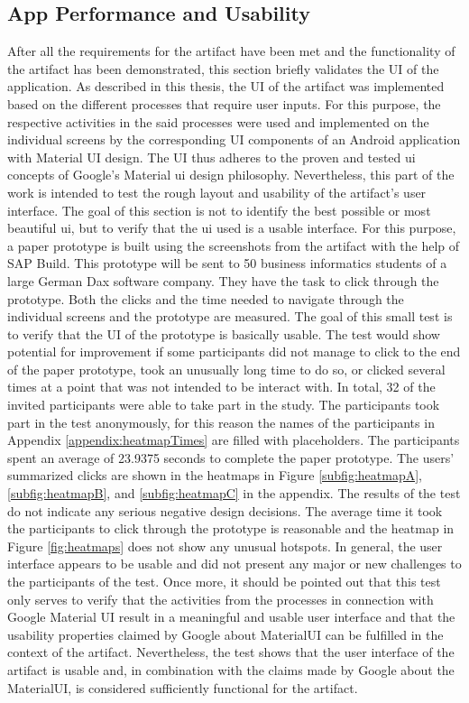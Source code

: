\subsection{App Performance and Usability}

After all the requirements for the artifact have been met and the functionality of the artifact has been demonstrated, this section briefly validates the UI of the application. As described in this thesis, the UI of the artifact was implemented based on the different processes that require user inputs. For this purpose, the respective activities in the said processes were used and implemented on the individual screens by the corresponding UI components of an Android application with Material UI design. The UI thus adheres to the proven and tested \ac{ui} concepts of Google's Material \ac{ui} design philosophy. Nevertheless, this part of the work is intended to test the rough layout and usability of the artifact's user interface. The goal of this section is not to identify the best possible or most beautiful \ac{ui}, but to verify that the \ac{ui} used is a usable interface. For this purpose, a paper prototype is built using the screenshots from the artifact with the help of SAP Build. This prototype will be sent to 50 business informatics students of a large German Dax software company. They have the task to click through the prototype. Both the clicks and the time needed to navigate through the individual screens and the prototype are measured. The goal of this small test is to verify that the UI of the prototype is basically usable. The test would show potential for improvement if some participants did not manage to click to the end of the paper prototype, took an unusually long time to do so, or clicked several times at a point that was not intended to be interact with. In total, 32 of the invited participants were able to take part in the study. The participants took part in the test anonymously, for this reason the names of the participants in Appendix \ref{appendix:heatmapTimes} are filled with placeholders. The participants spent an average of 23.9375 seconds to complete the paper prototype. The users' summarized clicks are shown in the heatmaps in Figure \ref{subfig:heatmapA}, \ref{subfig:heatmapB}, and \ref{subfig:heatmapC} in the appendix. The results of the test do not indicate any serious negative design decisions. The average time it took the participants to click through the prototype is reasonable and the heatmap in Figure \ref{fig:heatmaps} does not show any unusual hotspots. In general, the user interface appears to be usable and did not present any major or new challenges to the participants of the test. Once more, it should be pointed out that this test only serves to verify that the activities from the processes in connection with Google Material UI result in a meaningful and usable user interface and that the usability properties claimed by Google about MaterialUI can be fulfilled in the context of the artifact. Nevertheless, the test shows that the user interface of the artifact is usable and, in combination with the claims made by Google about the MaterialUI, is considered sufficiently functional for the artifact. 

